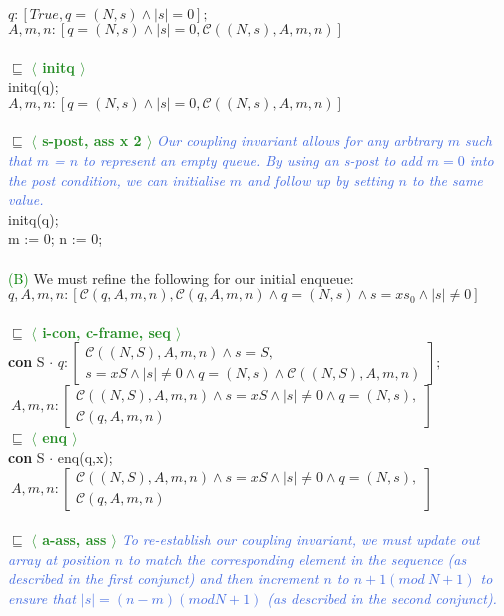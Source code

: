 \documentclass[a4paper]{scrartcl}
\newcommand{\C}{\mathcal{C}}
\newcommand{\refinedby}{\sqsubseteq} %
\newcommand{\rc}[1]{ $\refinedby$ \quad \textbf{\textcolor{ForestGreen}{$\langle$ #1 $\rangle$}}}
\newcommand{\explain}[1]{\textcolor{RoyalBlue}{\textit{#1}}}
\newcommand{\tabb}{\null \quad}
\begin{document}
{$q : [True, q = (N,s) \land |s| = 0];$ \\
$A, m, n : [ q = (N,s) \land |s| = 0, \C((N,s),A,m,n)]$ \\ \\
\rc{initq} \\
initq(q); \\
$A, m, n : [ q = (N,s) \land |s| = 0, \C((N,s),A,m,n)]$ \\  \\
\rc{s-post, ass x 2} \explain{Our coupling invariant allows for any arbtrary $m$ such that $m$ = $n$ to represent an empty queue. By using an s-post to add $m = 0$ into the post condition, we can initialise $m$ and follow up by setting $n$ to the same value.} \\
initq(q); \\
m := 0; n := 0; \\ \\
%
%
\textcolor{green}{(B)}
We must refine the following for our initial enqueue: \\ 
$q, A, m, n : [\C(q,A,m,n), \C(q,A,m,n) \land q = (N,s) \land s = xs_0 \land |s| \neq 0]$ \\ \\
%
%
\rc{i-con, c-frame, seq} \\
\textbf{con } S $\cdot$ $q : \left[
\begin{array}{l}
\C((N,S),A,m,n) \land s = S, \\
s = xS \land |s| \neq 0 \land q = (N,s) \land \C((N,S),A,m,n)
\end{array}
\right];$ \\
%
%
\tabb $~A, m, n : \left[
\begin{array}{l}
\C((N,S),A,m,n) \land  s = xS \land |s| \neq 0 \land q = (N,s), \\
\C(q,A,m,n) 
\end{array}
\right]$ \\
%
%
\rc{enq} \\
\textbf{con } S $\cdot$ enq(q,x);\\
\tabb $~A, m, n : \left[
\begin{array}{l}
\C((N,S),A,m,n) \land  s = xS \land |s| \neq 0 \land q = (N,s), \\
\C(q,A,m,n) 
\end{array}
\right]$ \\ \\
%
%
\rc{a-ass, ass} \explain{To re-establish our coupling invariant, we must update out array at position $n$ to match the corresponding element in the sequence (as described in the first conjunct) and then increment $n$ to $n + 1 (mod~N+1)$ to ensure that $|s| = (n - m)(mod N + 1)$ (as described in the second conjunct).} \\
}
\end{document}
